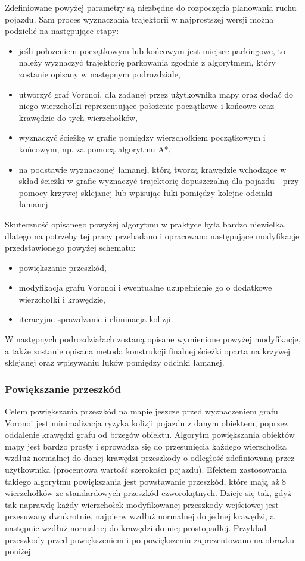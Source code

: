\documentclass[a4paper,11pt,twoside]{report}
\theoremstyle{definition}
\begin{document}
Zdefiniowane powyżej parametry są niezbędne do rozpoczęcia planowania ruchu pojazdu. Sam proces wyznaczania trajektorii w najprostszej wersji można podzielić na następujące etapy:
\begin{itemize}
	\item jeśli położeniem początkowym lub końcowym jest miejsce parkingowe, to należy wyznaczyć trajektorię parkowania zgodnie z algorytmem, który zostanie opisany w następnym podrozdziale,
	\item utworzyć graf Voronoi, dla zadanej przez użytkownika mapy oraz dodać do niego wierzchołki reprezentujące położenie początkowe i końcowe oraz krawędzie do tych wierzchołków,
	\item wyznaczyć ścieżkę w grafie pomiędzy wierzchołkiem początkowym i końcowym, np. za pomocą algorytmu A*,
	\item na podstawie wyznaczonej łamanej, którą tworzą krawędzie wchodzące w skład ścieżki w grafie wyznaczyć trajektorię dopuszczalną dla pojazdu - przy pomocy krzywej sklejanej lub wpisując łuki pomiędzy kolejne odcinki łamanej.
\end{itemize}

Skuteczność opisanego powyżej algorytmu w praktyce była bardzo niewielka, dlatego na potrzeby tej pracy przebadano i opracowano następujące modyfikacje przedstawionego powyżej schematu:
\begin{itemize}
	\item powiększanie przeszkód,
	\item modyfikacja grafu Voronoi i ewentualne uzupełnienie go o dodatkowe wierzchołki i krawędzie,
	\item iteracyjne sprawdzanie i eliminacja kolizji.
\end{itemize}

W następnych podrozdziałach zostaną opisane wymienione powyżej modyfikacje, a także zostanie opisana metoda konstrukcji finalnej ścieżki oparta na krzywej sklejanej oraz wpisywaniu łuków pomiędzy odcinki łamanej.

\subsubsection{Powiększanie przeszkód}

Celem powiększania przeszkód na mapie jeszcze przed wyznaczeniem grafu Voronoi jest minimalizacja ryzyka kolizji pojazdu z danym obiektem, poprzez oddalenie krawędzi grafu od brzegów obiektu. Algorytm powiększania obiektów mapy jest bardzo prosty i sprowadza się do przesunięcia każdego wierzchołka wzdłuż normalnej do danej krawędzi przeszkody o odległość zdefiniowaną przez użytkownika (procentowa wartość szerokości pojazdu). Efektem zastosowania takiego algorytmu powiększania jest powstawanie przeszkód, które mają aż 8 wierzchołków ze standardowych przeszkód czworokątnych. Dzieje się tak, gdyż tak naprawdę każdy wierzchołek modyfikowanej przeszkody wejściowej jest przesuwany dwukrotnie, najpierw wzdłuż normalnej do jednej krawędzi, a następnie wzdłuż normalnej do krawędzi do niej prostopadłej. Przykład przeszkody przed powiększeniem i po powiększeniu zaprezentowano na obrazku poniżej.
\end{document}
